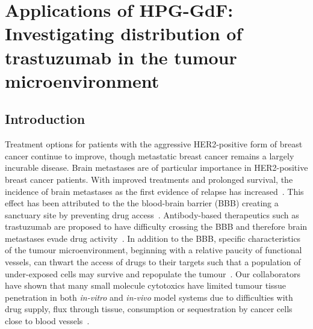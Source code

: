 
\chapter{Applications of \acs{HPG-GdF}: Investigating distribution of trastuzumab in the tumour microenvironment}
\label{ch:HPG2}


\section{Introduction}

Treatment options for patients with the aggressive \acs{HER2}-positive form of breast cancer continue to improve, though metastatic breast cancer remains a largely incurable disease.
Brain metastases are of particular importance in \acs{HER2}-positive breast cancer patients.
With improved treatments and prolonged survival, the incidence of brain metastases as the first evidence of relapse has increased~\cite{Seal:2012cn,Bria:2007gc}.
This effect has been attributed to the the blood-brain barrier (\acs{BBB}) creating a sanctuary site by preventing drug access~\cite{Kaplan:2014es,Lai:2004bd}.
Antibody-based therapeutics such as trastuzumab are proposed to have difficulty crossing the \acs{BBB} and therefore brain metastases evade drug activity~\cite{Seal:2012cn,Murrell:2015bz,Stemmler:2006}.
In addition to the \acs{BBB}, specific characteristics of the tumour microenvironment, beginning with a relative paucity of functional vessels, can thwart the access of drugs to their targets such that a population of under-exposed cells may survive and repopulate the tumour~\cite{Minchinton:2006gs}.
Our collaborators have shown that many small molecule cytotoxics have limited tumour tissue penetration in both \emph{in-vitro} and \emph{in-vivo} model systems due to difficulties with drug supply, flux through tissue, consumption or sequestration by cancer cells close to blood vessels~\cite{Kyle:2014cy,Kyle:2007ch,Huxham:2004hm,Kyle:2004fo,Kyle:1999kr}.

